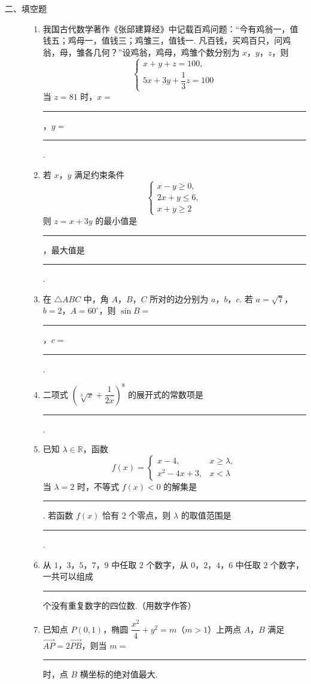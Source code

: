 \begin{description}

    \item[二、填空题]

    \begin{enumerate}[leftmargin=5pt]

      \addtocounter{enumi}{+10}

        \item 我国古代数学著作《张邱建算经》中记载百鸡问题：“今有鸡翁一，值钱五；鸡母一，值钱三；鸡雏三，值钱一. 凡百钱，买鸡百只，问鸡翁，母，雏各几何？”设鸡翁，鸡母，鸡雏个数分别为 \(x\)，\(y\)，\(z\)，则
\[
\begin{cases}

x+y+z=100,\\
5x+3y+\dfrac{1}{3}z=100

\end{cases}
\]当 \(z=81\) 时，\(x=\)\rule[-0.3ex]{3em}{0.4pt}，\(y=\)\rule[-0.3ex]{3em}{0.4pt}.

        \item 若 \(x\)，\(y\) 满足约束条件
\[
\begin{cases}

x-y\ge0,\\
2x+y\le6,\\
x+y\ge2

\end{cases}
\]则 \(z=x+3y\) 的最小值是\rule[-0.3ex]{3em}{0.4pt}，最大值是\rule[-0.3ex]{3em}{0.4pt}.

        \item 在 \(\triangle ABC\) 中，角 \(A\)，\(B\)，\(C\) 所对的边分别为 \(a\)，\(b\)，\(c\). 若 \(a=\sqrt7\)，\(b=2\)，\(A=60^\circ\)，则 \(\sin B=\)\rule[-0.3ex]{3em}{0.4pt}，\(c=\)\rule[-0.3ex]{3em}{0.4pt}.

        \item 二项式 \(\left(\sqrt[3]{x}+\dfrac{1}{2x}\right)^8\) 的展开式的常数项是\rule[-0.3ex]{3em}{0.4pt}.

        \item 已知 \(\lambda\in\mathbb{R}\)，函数
\[
f(x)=\begin{cases}

x-4, & x\ge\lambda,\\
x^2-4x+3, & x<\lambda

\end{cases}
\]当 \(\lambda=2\) 时，不等式 \(f(x)<0\) 的解集是\rule[-0.3ex]{3em}{0.4pt}. 若函数 \(f(x)\) 恰有 \(2\) 个零点，则 \(\lambda\) 的取值范围是\rule[-0.3ex]{3em}{0.4pt}.

        \item 从 \(1\)，\(3\)，\(5\)，\(7\)，\(9\) 中任取 \(2\) 个数字，从 \(0\)，\(2\)，\(4\)，\(6\) 中任取 \(2\) 个数字，一共可以组成\rule[-0.3ex]{3em}{0.4pt} 个没有重复数字的四位数.（用数字作答）

        \item 已知点 \(P(0,1)\)，椭圆 \(\dfrac{x^2}{4}+y^2=m\)（\(m>1\)）上两点 \(A\)，\(B\) 满足 \(\overrightarrow{AP}=2\overrightarrow{PB}\)，则当 \(m=\)\rule[-0.3ex]{3em}{0.4pt} 时，点 \(B\) 横坐标的绝对值最大.

    \end{enumerate}

\end{description}

